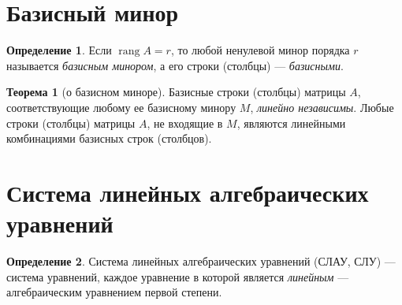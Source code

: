 \documentclass[a5paper, 11pt]{extbook}
\theoremstyle{definition}
\newtheorem{theorem}{Теорема}[section]
\theoremstyle{definition}
\newtheorem{definition}{Определение}[section]
\theoremstyle{definition}
\DeclareMathOperator{\rang}{rang}
\begin{document}
\section{Базисный минор}

\begin{definition}
    Если \(\rang A = r\), то любой ненулевой минор порядка \(r\) называется \textit{базисным минором}, а его строки (столбцы) — \textit{базисными}.
\end{definition}

\begin{theorem}[о базисном миноре]
    Базисные строки (столбцы) матрицы \(A\), соответствующие любому ее базисному минору \(M\), \textit{линейно независимы}. Любые строки (столбцы) матрицы \(A\), не входящие в \(M\), являются линейными комбинациями базисных строк (столбцов).
\end{theorem}


\section{Система линейных алгебраических уравнений}

\begin{definition}
    Система линейных алгебраических уравнений (СЛАУ, СЛУ) — система уравнений, каждое уравнение в которой является \textit{линейным} — алгебраическим уравнением первой степени.
\end{definition}
\end{document}
